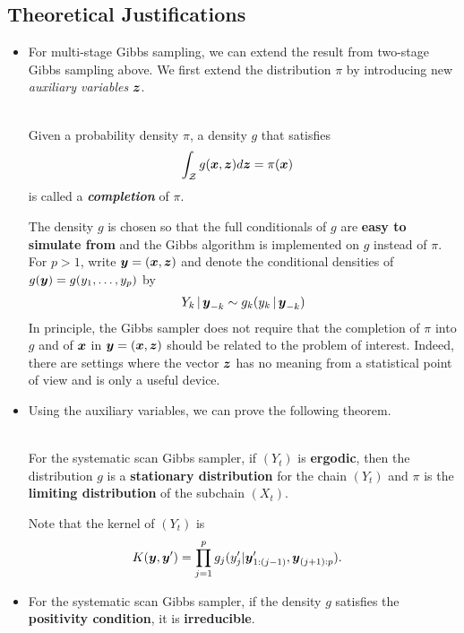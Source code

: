 \documentclass[11pt]{article}
\begin{document}
\subsection{Theoretical Justifications}
\begin{itemize}
\item For multi-stage Gibbs sampling, we can extend the result from two-stage Gibbs sampling above. We first extend the distribution $\pi$ by introducing new \emph{auxiliary variables} $\boldsymbol{z}$. 
\begin{definition}\citep{robert1999monte}\\ 
Given a probability density $\pi$, a density $g$ that satisfies
\begin{align}
\int_{{\mathcal Z}} g(\boldsymbol{x}, \boldsymbol{z}) d\boldsymbol{z} &= \pi(\boldsymbol{x}) \label{eqn: completion}
\end{align} is called a \emph{\textbf{completion}} of $\pi$.
\end{definition}
The density $g$ is chosen so that the full conditionals of $g$ are \textbf{easy to simulate from} and the Gibbs algorithm is implemented on $g$ instead of $\pi$. For $p > 1$, write $\boldsymbol{y} = (\boldsymbol{x}, \boldsymbol{z})$ and denote the conditional densities of $g(\boldsymbol{y}) = g(y_1, \ldots, y_p)$ by
\begin{align*}
Y_{k} \,|\,\boldsymbol{y}_{-k} \sim g_{k}(y_k \,|\, \boldsymbol{y}_{-k})
\end{align*} 
In principle, the Gibbs sampler does not require that the completion of $\pi$ into $g$ and of $\boldsymbol{x}$ in $\boldsymbol{y} = (\boldsymbol{x}, \boldsymbol{z})$ should be related to the problem of interest. Indeed, there are settings where the vector $\boldsymbol{z}$ has no meaning from a statistical point of view and is only a useful device.

\item Using the auxiliary variables, we can prove the following theorem.
\begin{theorem}\citep{robert1999monte}\\ 
For the systematic scan Gibbs sampler, if $(Y_t)$ is \textbf{ergodic}, then the distribution $g$ is a \textbf{stationary distribution} for the chain $(Y_t)$ and $\pi$ is the \textbf{limiting distribution} of the subchain $(X_t)$.
\end{theorem} Note that the kernel of $(Y_t)$ is
\begin{align*}
K(\boldsymbol{y}, \boldsymbol{y}') &= \prod_{j=1}^{p}g_{j}(y_{j}'| \boldsymbol{y}_{1:(j-1)}', \boldsymbol{y}_{(j+1):p}).
\end{align*}

\item \begin{theorem}
For the systematic scan Gibbs sampler, if the density $g$ satisfies the \textbf{positivity condition}, it is \textbf{irreducible}.
\end{theorem}


\end{itemize}
\end{document}
